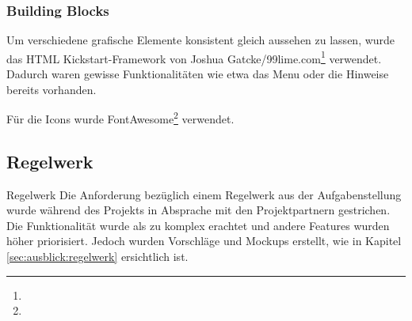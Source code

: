 \subsubsection*{Building Blocks}

Um verschiedene grafische Elemente konsistent gleich aussehen zu lassen, wurde das HTML Kickstart-Framework von Joshua Gatcke/99lime.com\footnote{} verwendet. Dadurch waren gewisse Funktionalitäten wie etwa das Menu oder die Hinweise bereits vorhanden.

Für die Icons wurde FontAwesome\footnote{} verwendet.

\subsection*{Regelwerk}

\begin{decision}{Regelwerk}
Die Anforderung bezüglich einem Regelwerk aus der Aufgabenstellung wurde während des Projekts in Absprache mit den Projektpartnern gestrichen. Die Funktionalität wurde als zu komplex erachtet und andere Features wurden höher priorisiert. Jedoch wurden Vorschläge und Mockups erstellt, wie in Kapitel \ref{sec:ausblick:regelwerk} ersichtlich ist.
\end{decision}
